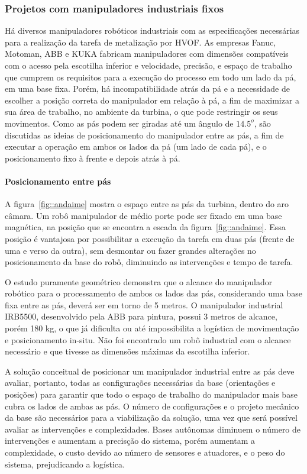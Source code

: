\subsubsection{Projetos com manipuladores industriais fixos}\label{proj_manip}
Há diversos manipuladores robóticos industriais com as especificações
necessárias para a realização da tarefa de metalização por HVOF. As empresas
Fanuc, Motoman, ABB e KUKA fabricam manipuladores com dimensões compatíveis com o
acesso pela escotilha inferior e velocidade, precisão, e espaço de trabalho que
cumprem os requisitos para a execução do processo em todo um lado da pá, em uma
base fixa. Porém, há incompatibilidade atrás da pá e a necessidade de escolher a
posição correta do manipulador em relação à pá, a fim de maximizar a sua área de trabalho, no ambiente da
turbina, o que pode restringir os seus movimentos.
Como as pás podem ser giradas até um ângulo de $14.5^o$, são discutidas as ideias de posicionamento
do manipulador entre as pás, a fim de executar a operação em ambos os lados da
pá (um lado de cada pá), e o posicionamento fixo à frente e depois atrás à pá.

\paragraph{Posicionamento entre pás}

A figura~\ref{fig::andaime} mostra o espaço entre as pás da turbina, dentro do
aro câmara. Um robô manipulador de médio porte pode ser fixado em uma base
magnética, na posição que se encontra a escada da figura~\ref{fig::andaime}.
Essa posição é vantajosa por possibilitar a execução da tarefa em duas pás
(frente de uma e verso da outra), sem desmontar ou fazer grandes alterações no
posicionamento da base do robô, diminuindo as intervenções e tempo de tarefa.

O estudo puramente geométrico demonstra que o alcance do manipulador robótico
para o processamento de ambos os lados das pás, considerando uma base fixa entre
as pás, deverá ser em torno de 5 metros. O manipulador industrial IRB5500,
desenvolvido pela ABB para pintura, possui 3 metros de alcance, porém 180 kg, o que já dificulta ou até impossibilita a
logística de movimentação e posicionamento in-situ. Não foi encontrado um robô
industrial com o alcance necessário e que tivesse as dimensões máximas da
escotilha inferior. 

A solução conceitual de posicionar um manipulador industrial entre as pás deve
avaliar, portanto, todas as configurações necessárias da base (orientações e
posições) para garantir que todo o espaço de trabalho do manipulador mais base
cubra os lados de ambas as pás. O número de configurações e o projeto
mecânico da base são necessários para a viabilização da solução,
uma vez que será possível avaliar as intervenções e complexidades. Bases
autônomas diminuem o número de intervenções e aumentam a precisção do sistema,
porém aumentam a complexidade, o custo devido ao número de sensores e atuadores,
e o peso do sistema, prejudicando a logística.

